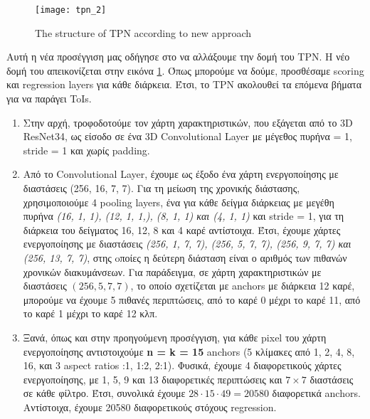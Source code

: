 \en
\begin{figure}[h]
  \centering
  \texttt{[image: tpn\_2]}
  \caption{\en The structure of TPN according to new approach}
  \label{fig:gr_New_structure}
\end{figure}

\gr

Αυτή η νέα προσέγγιση μας οδήγησε στο να αλλάξουμε την δομή του \en TPN\gr. Η νέο δομή του απεικονίζεται στην εικόνα  \ref{fig:gr_New_structure}. Όπως
μπορούμε να δούμε, προσθέσαμε \en scoring \gr και \en regression layers \gr για κάθε διάρκεια. Έτσι, το \en TPN \gr ακολουθεί τα επόμενα βήματα για να παράγει \en ToIs\gr.
\begin{enumerate}
\item Στην αρχή, τροφοδοτούμε τον χάρτη χαρακτηριστικών, που εξάγεται από το \en 3D ResNet34\gr, ως είσοδο σε ένα \en 3D Convolutional Layer \gr με μέγεθος πυρήνα = 1,
  \en stride = 1 \gr και χωρίς \en padding\gr.
\item Από το \en Convolutional Layer\gr, έχουμε ως έξοδο ένα χάρτη ενεργοποίησης με διαστάσεις (256, 16, 7, 7). Για τη μείωση της χρονικής διάστασης, χρησιμοποιούμε 4 \en pooling layers\gr,
  ένα για κάθε δείγμα διάρκειας με μεγέθη πυρήνα  \textit{(16, 1, 1), (12, 1, 1,), (8, 1, 1) και (4, 1, 1)} και \en stride = 1\gr, για τη διάρκεια του δείγματος 16, 12, 8 και 4 καρέ αντίστοιχα.
  Έτσι, έχουμε χάρτες ενεργοποίησης με διαστάσεις \textit{(256, 1, 7, 7), (256, 5, 7, 7), (256, 9, 7, 7) και (256, 13, 7, 7)}, στης oποίες η δεύτερη διάσταση είναι ο αριθμός των πιθανών
  χρονικών διακυμάνσεων. Για παράδειγμα, σε  χάρτη χαρακτηριστικών με διαστάσεις $(256, 5, 7, 7)$, το οποίο σχετίζεται με \en anchors \gr με διάρκεια 12 καρέ, μπορούμε να έχουμε 5 πιθανές περιπτώσεις,
  από το καρέ 0 μέχρι το καρέ 11, από το καρέ 1 μέχρι το καρέ 12 κλπ.
  
\item Ξανά, όπως και στην προηγούμενη προσέγγιση, για κάθε \en pixel \gr του χάρτη ενεργοποίησης αντιστοιχούμε \en\textbf{n = k = 15}
  anchors \gr(5 κλίμακες από 1, 2, 4, 8, 16, και 3 \en aspect ratios :1, 1:2, 2:1). Φυσικά, έχουμε 4 διαφορετικούς χάρτες ενεργοποίησης, με 1, 5, 9 και 13
  διαφορετικές περιπτώσεις και  $7  \times 7$ διαστάσεις σε κάθε φίλτρο. Έτσι, συνολικά έχουμε $28  \cdot 15 \cdot 49 = 20580$ διαφορετικά \en anchors\gr.
  Αντίστοιχα, έχουμε 20580 διαφορετικούς στόχους \en regression\gr.

\end{enumerate}

